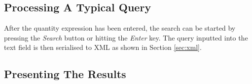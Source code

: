 \subsection{Processing A Typical Query}

After the quantity expression has been entered, the search can be started by pressing the \textit{Search} button or hitting the \textit{Enter} key. The query inputted into the text field is then serialised to XML as shown in Section \ref{sec:xml}.



\subsection{Presenting The Results}
